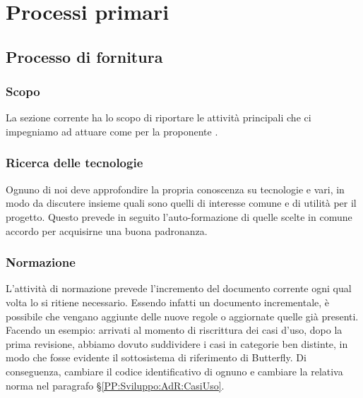 \section{Processi primari}\label{ProcessiPrimari}

    \subsection{Processo di fornitura}\label{PP:Fornitura}	%

        \subsubsection{Scopo}\label{PP:Fornitura:Scopo}
		La sezione corrente ha lo scopo di riportare le attività principali che ci impegniamo ad attuare come  per la proponente \II.

		\subsubsection{Ricerca delle tecnologie}
		Ognuno di noi deve approfondire la propria conoscenza su tecnologie e  vari, in modo da discutere insieme quali sono quelli di interesse comune e di utilità per il progetto. Questo prevede in seguito l'auto-formazione di quelle scelte in comune accordo per acquisirne una buona padronanza.

		\subsubsection{Normazione}\label{Normazione}
		L'attività di normazione prevede l'incremento del documento corrente ogni qual volta lo si ritiene necessario.
		Essendo infatti un documento incrementale, è possibile che vengano aggiunte delle nuove regole o aggiornate quelle già presenti.
		Facendo un esempio: arrivati al momento di riscrittura dei casi d'uso, dopo la prima revisione, abbiamo dovuto suddividere i casi in categorie ben distinte, in modo che fosse evidente il sottosistema di riferimento di Butterfly.
		Di conseguenza, cambiare il codice identificativo di ognuno e cambiare la relativa norma nel paragrafo \S\ref{PP:Sviluppo:AdR:CasiUso}.

